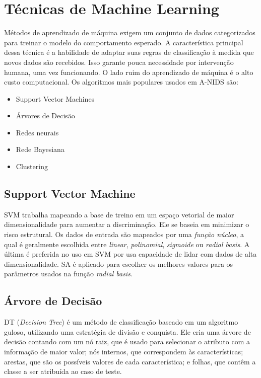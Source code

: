  \section{Técnicas de Machine Learning}
 Métodos de aprendizado de máquina exigem um conjunto de dados categorizados para treinar o modelo do comportamento
 esperado. A característica principal dessa técnica é a habilidade de adaptar suas regras de classificação à medida que
 novos dados são recebidos. Isso garante pouca necessidade por intervenção humana, uma vez funcionando. O lado ruim
 do aprendizado de máquina é o alto custo computacional. Os algoritmos mais populares usados em A-NIDS são:
 \begin{itemize}
    \item Support Vector Machines
    \item Árvores de Decisão
    \item Redes neurais
    \item Rede Bayesiana
    \item Clustering
\end{itemize}

    \subsection{Support Vector Machine}
    SVM trabalha mapeando a base de treino em um espaço vetorial de maior dimensionalidade para aumentar a discriminação.
    Ele se baseia em minimizar o risco estrutural. Os dados de entrada são mapeados por uma \textit{função núcleo}, a qual
    é geralmente escolhida entre \textit{linear}, \textit{polinomial}, \textit{sigmoide} ou \textit{radial basis}. A última
    é preferida no uso em SVM por usa capacidade de lidar com dados de alta dimensionalidade. SA é aplicado para escolher
    os melhores valores para os parâmetros usados na função \textit{radial basis}.

    \subsection{Árvore de Decisão}
    DT (\emph{Decision Tree}) é um método de classificação baseado em um algoritmo guloso, utilizando uma estratégia de divisão e conquista. Ele
    cria uma árvore de decisão contando com um nó raiz, que é usado para selecionar o atributo com a informação de maior valor;
    nós internos, que correspondem às características; arestas, que são os possíveis valores de cada característica; e
    folhas, que contêm a classe a ser atribuída ao caso de teste.

